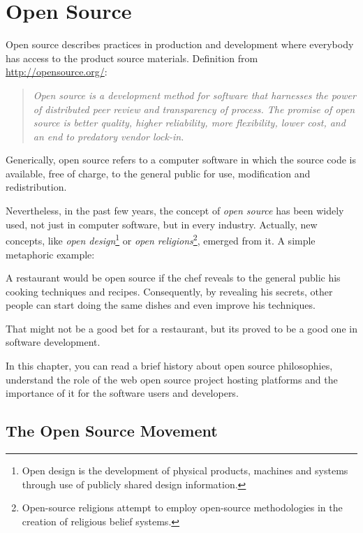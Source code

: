 \thispagestyle{empty}
\chapter{Open Source}\label{chap:open_source}


 
Open source describes practices in production and development where everybody has access to the product source materials.
Definition from \url{http://opensource.org/}:
\begin{quote}\emph{
  Open source is a development method for software that harnesses the power of distributed peer review and transparency of process.
  The promise of open source is better quality, higher reliability, more flexibility, lower cost, 
  and an end to predatory vendor lock-in.
}\end{quote}

Generically, open source refers to a computer software in which the source code is available, free of charge, to the general public for use, modification and redistribution.

Nevertheless, in the past few years, the concept of \emph{open source} 
has been widely used, not just in computer software, but in every industry.
Actually, new concepts, like 
\emph{open design}\footnote{
  Open design is the development of physical products, machines and systems through use of publicly shared design information.
} or 
\emph{open religions}\footnote{
  Open-source religions attempt to employ open-source methodologies in the creation of religious belief systems.
},
emerged from it.
A simple metaphoric example: 

A restaurant would be open source if the chef reveals to the general public his cooking techniques and recipes.
Consequently, by revealing his secrets, other people can start doing the same dishes and even improve his techniques.

That might not be a good bet for a restaurant, but its proved to be a good one in software development.

In this chapter, you can read a brief history about open source philosophies, 
understand the role of the web open source project hosting platforms
and the importance of it for the software users and developers.


\section{The Open Source Movement}

